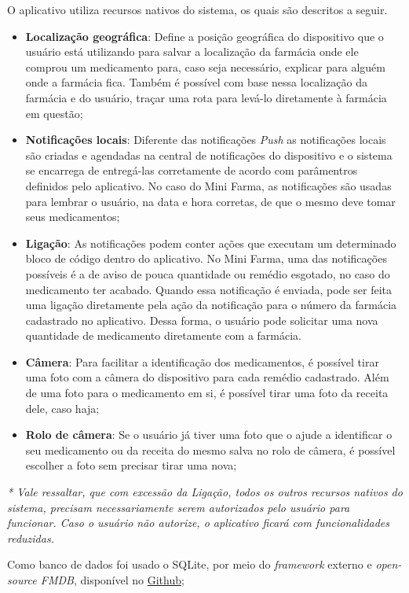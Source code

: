O aplicativo utiliza recursos nativos do sistema, os quais são descritos a seguir. 
\begin{itemize}
	\item \textbf{Localização geográfica}: Define a posição geográfica do dispositivo que o usuário está utilizando para salvar a 
    localização da farmácia onde ele comprou um medicamento para, caso seja necessário, explicar para alguém onde a 
    farmácia fica. Também é possível com base nessa localização da farmácia e do usuário, traçar uma rota para levá-lo diretamente à 
    farmácia em questão;
	\item \textbf{Notificações locais}: Diferente das notificações \textit{Push} as notificações locais são criadas e agendadas na central 
    de notificações do dispositivo e o sistema se encarrega de entregá-las corretamente de acordo com parâmentros definidos pelo aplicativo. 
    No caso do Mini Farma, as notificações são usadas para lembrar o usuário, na data e hora corretas, de que o mesmo deve tomar seus medicamentos;
	\item \textbf{Ligação}: As notificações podem conter ações que executam um determinado bloco de código dentro do aplicativo. No Mini Farma, 
    uma das notificações possíveis é a de aviso de pouca quantidade ou remédio esgotado, no caso do medicamento ter acabado. 
    Quando essa notificação é enviada, pode ser feita uma ligação diretamente pela ação da notificação para o número da 
    farmácia cadastrado no aplicativo. Dessa forma, o usuário pode solicitar uma nova quantidade de medicamento diretamente com a farmácia. 
	\item \textbf{Câmera}: Para facilitar a identificação dos medicamentos, é possível tirar uma foto com a câmera do dispositivo para 
    cada remédio cadastrado. Além de uma foto para o medicamento em si, é possível tirar uma foto da receita dele, caso haja;
    \item \textbf{Rolo de câmera}: Se o usuário já tiver uma foto que o ajude a identificar o seu medicamento ou da receita do mesmo salva 
    no rolo de câmera, é possível escolher a foto sem precisar tirar uma nova;
\end{itemize}

\textit{* Vale ressaltar, que com excessão da Ligação, todos os outros recursos nativos do sistema, precisam necessariamente serem autorizados pelo
usuário para funcionar. Caso o usuário não autorize, o aplicativo ficará com funcionalidades reduzidas.} 

Como banco de dados foi usado o SQLite, por meio do \textit{framework} externo e \textit{open-source FMDB}, 
disponível no \href{https://github.com/ccgus/fmdb}{Github};

